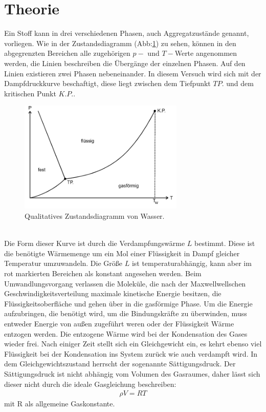 \section{Theorie}
\label{sec:Theorie}

Ein Stoff kann in drei verschiedenen Phasen, auch Aggregatzustände genannt, vorliegen.
Wie in der Zustandsdiagramm (Abb:\ref{fig:zustand}) zu sehen, können in den abgegrenzten
Bereichen alle zugehörigen $p-$ und $T-$Werte angenommen werden, die Linien
beschreiben die Übergänge der einzelnen Phasen. Auf den Linien existieren zwei
Phasen nebeneinander. In diesem Versuch wird sich mit der Dampfdruckkurve beschaftigt, diese
liegt zwischen dem Tiefpunkt $TP.$ und dem kritischen Punkt $K.P.$.
\begin{figure}
 \centering
 \includegraphics[width=0.7\textwidth]{zustand.png}
 \caption{Qualitatives Zustandsdiagramm von Wasser.}
 \label{fig:zustand}
 \end{figure}\\
 Die Form dieser Kurve ist durch die Verdampfungswärme $L$ bestimmt. Diese ist die benötigte Wärmemenge
 um ein Mol einer Flüssigkeit in Dampf gleicher Temperatur umzuwandeln. Die Größe $L$ ist
 temperaturabhängig, kann aber im rot markierten Bereichen als konstant angesehen werden.
 Beim Umwandlungsvorgang verlassen die Moleküle, die nach der Maxwellwellschen
 Geschwindigkeitsverteilung maximale kinetische Energie besitzen, die Flüssigkeitsoberfläche
 und gehen über in die gasförmige Phase. Um die Energie aufzubringen, die benötigt wird, um
 die Bindungskräfte zu überwinden, muss entweder Energie von außen zugeführt weren oder
 der Flüssigkeit Wärme entzogen werden. Die entzogene Wärme wird bei der Kondensation des
 Gases wieder frei. Nach einiger Zeit stellt sich ein Gleichgewicht ein, es kehrt ebenso
 viel Flüssigkeit bei der Kondensation ins System zurück wie auch verdampft wird.
 In dem Gleichgewichtszustand herrscht der sogenannte Sättigungsdruck.
 Der Sättigungsdruck ist nicht abhängig vom Volumen des Gasraumes, daher lässt sich dieser nicht durch
 die ideale Gasgleichung beschreiben:
 \begin{align}
 \rho V =RT
 \end{align}
 mit R als allgemeine Gaskonstante.
